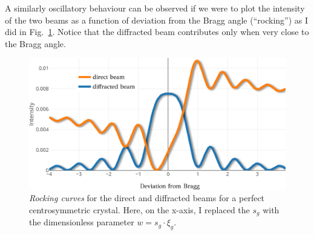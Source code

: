 A similarly oscillatory behaviour can be observed if we were to plot the intensity of the two beams as a function of deviation from the Bragg angle (``rocking'') as I did in Fig.~\ref{Fig:rocking}. Notice that the diffracted beam contributes only when very close to the Bragg angle. 


\begin{figure}[ht]
    \centering
\includegraphics[width=0.84\linewidth]{Figures/rocking.png}
\caption[Rocking curves.]{\textit{Rocking curves} for the direct and diffracted beams for a perfect centrosymmetric crystal. Here, on the x-axis, I replaced the $s_g$ with the dimensionless parameter $w=s_g \cdot\xi_g$.}
\label{Fig:rocking}

\end{figure}
